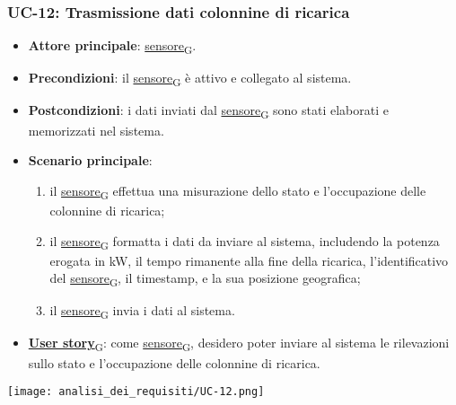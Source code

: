 \newpage
\subsubsection{UC-12: Trasmissione dati colonnine di ricarica}
\begin{itemize}
	\item \textbf{Attore principale}: \href{https://7last.github.io/docs/pb/documentazione-interna/glossario\#sensore}{sensore\textsubscript{G}}.
	\item \textbf{Precondizioni}: il \href{https://7last.github.io/docs/pb/documentazione-interna/glossario\#sensore}{sensore\textsubscript{G}} è attivo e collegato al sistema.
	\item \textbf{Postcondizioni}: i dati inviati dal \href{https://7last.github.io/docs/pb/documentazione-interna/glossario\#sensore}{sensore\textsubscript{G}} sono stati elaborati e memorizzati nel sistema.
	\item \textbf{Scenario principale}:
	      \begin{enumerate}
		      \item il \href{https://7last.github.io/docs/pb/documentazione-interna/glossario\#sensore}{sensore\textsubscript{G}} effettua una misurazione dello stato e l'occupazione delle colonnine di ricarica;
		      \item il \href{https://7last.github.io/docs/pb/documentazione-interna/glossario\#sensore}{sensore\textsubscript{G}} formatta i dati da inviare al sistema, includendo la potenza erogata in kW, il tempo rimanente alla fine della ricarica, l'identificativo del \href{https://7last.github.io/docs/pb/documentazione-interna/glossario\#sensore}{sensore\textsubscript{G}},
		            il timestamp, e la sua posizione geografica;
		      \item il \href{https://7last.github.io/docs/pb/documentazione-interna/glossario\#sensore}{sensore\textsubscript{G}} invia i dati al sistema.
	      \end{enumerate}
	\item \href{https://7last.github.io/docs/pb/documentazione-interna/glossario\#user-story}{\textbf{User story}\textsubscript{G}}:
	      come \href{https://7last.github.io/docs/pb/documentazione-interna/glossario\#sensore}{sensore\textsubscript{G}}, desidero poter inviare al sistema le rilevazioni sullo stato e l'occupazione delle colonnine di ricarica.
\end{itemize}
\begin{center}
	\texttt{[image: analisi\_dei\_requisiti/UC-12.png]}
\end{center}

